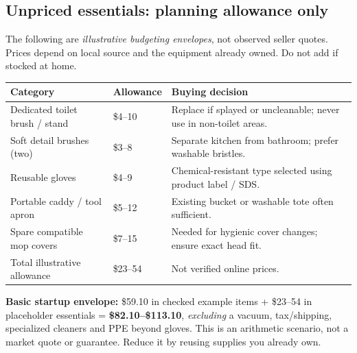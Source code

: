 \documentclass[10pt,letterpaper,oneside]{article}
\newcommand{\smalltable}{\par\small\renewcommand{\arraystretch}{1.24}}
\newcommand{\restorenormalfonttable}{\par\normalsize\renewcommand{\arraystretch}{1}}
\begin{document}
\subsection{Unpriced essentials: planning allowance only}
The following are \emph{illustrative budgeting envelopes}, not observed seller quotes. Prices depend on local source and the equipment already owned. Do not add if stocked at home.
\smalltable\begin{tabularx}{\linewidth}{X p{.18\linewidth}X}\toprule
Category & Allowance & Buying decision\\\midrule
Dedicated toilet brush / stand & \$4--10 & Replace if splayed or uncleanable; never use in non-toilet areas.\\
Soft detail brushes (two) & \$3--8 & Separate kitchen from bathroom; prefer washable bristles.\\
Reusable gloves & \$4--9 & Chemical-resistant type selected using product label / SDS.\\
Portable caddy / tool apron & \$5--12 & Existing bucket or washable tote often sufficient.\\
Spare compatible mop covers & \$7--15 & Needed for hygienic cover changes; ensure exact head fit.\\\midrule
Total illustrative allowance & \$23--54 & Not verified online prices.\\\bottomrule\end{tabularx}\restorenormalfonttable
\begin{notebox}\textbf{Basic startup envelope:} \$59.10 in checked example items + \$23--54 in placeholder essentials = \textbf{\$82.10--\$113.10}, \emph{excluding} a vacuum, tax/shipping, specialized cleaners and PPE beyond gloves. This is an arithmetic scenario, not a market quote or guarantee. Reduce it by reusing supplies you already own.\end{notebox}
\end{document}
